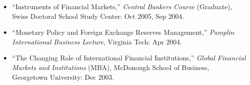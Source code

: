 \documentclass[letter,11pt]{article}
\begin{document}
\begin{itemize}[--]
    \item \enquote{Instruments of Financial Markets,} \emph{Central Bankers Course} (Graduate), Swiss Doctoral School Study Center: Oct 2005, Sep 2004.
    \item \enquote{Monetary Policy and Foreign Exchange Reserves Management,} \emph{Pamplin International Business Lecture}, Virginia Tech: Apr 2004.
    \item \enquote{The Changing Role of International Financial Institutions,} \emph{Global Financial Markets and Institutions} (MBA), McDonough School of Business, Georgetown University: Dec 2003.
\end{itemize}
\end{document}

